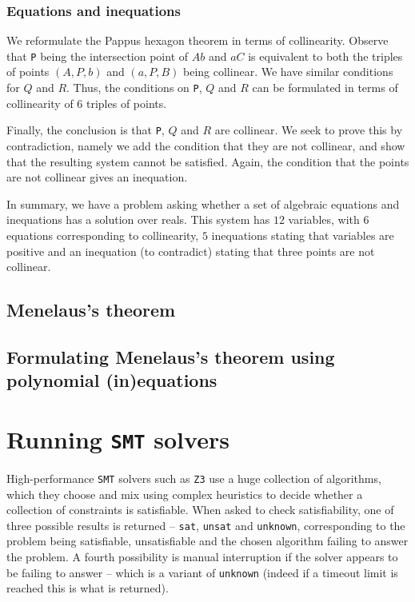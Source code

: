\documentclass{amsart}
\theoremstyle{plain}
\theoremstyle{definition}
\theoremstyle{remark}
\begin{document}
\subsubsection{Equations and inequations}

We reformulate the Pappus hexagon theorem in terms of collinearity.
Observe that \texttt{P} being the intersection point of \(Ab\) and \(aC\) is
equivalent to both the triples of points \((A, P, b)\) and \((a, P, B)\)
being collinear. We have similar conditions for \(Q\) and \(R\). Thus,
the conditions on \texttt{P}, \(Q\) and \(R\) can be formulated in terms of
collinearity of \(6\) triples of points.

Finally, the conclusion is that \texttt{P}, \(Q\) and \(R\) are collinear. We
seek to prove this by contradiction, namely we add the condition that
they are not collinear, and show that the resulting system cannot be
satisfied. Again, the condition that the points are not collinear gives
an inequation.

In summary, we have a problem asking whether a set of algebraic
equations and inequations has a solution over reals. This system has
\(12\) variables, with \(6\) equations corresponding to collinearity,
\(5\) inequations stating that variables are positive and an inequation
(to contradict) stating that three points are not collinear.

\subsection{Menelaus's theorem}

\subsection{Formulating Menelaus's theorem using polynomial (in)equations}


\section{Running \texttt{SMT} solvers}\label{running-smt-solvers}

High-performance \texttt{SMT} solvers such as \texttt{Z3} use a huge collection of algorithms, which they
choose and mix using complex heuristics to decide whether a collection
of constraints is satisfiable. When asked to check satisfiability, one of three possible
results is returned -- \texttt{sat}, \texttt{unsat} and \texttt{unknown}, corresponding to 
the problem being satisfiable, unsatisfiable and the chosen algorithm failing to answer 
the problem. A fourth possibility is manual interruption if the solver appears to be failing 
to answer -- which is a variant of \texttt{unknown} (indeed if a timeout limit is reached this 
is what is returned).
\end{document}
